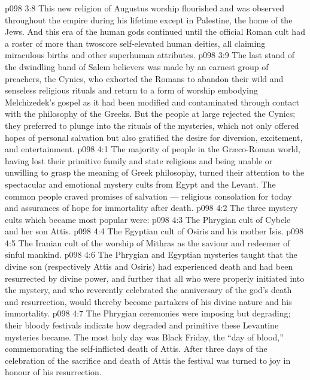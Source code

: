\vs p098 3:8 This new religion of Augustus worship flourished and was observed throughout the empire during his lifetime except in Palestine, the home of the Jews. And this era of the human gods continued until the official Roman cult had a roster of more than twoscore self\hyp{}elevated human deities, all claiming miraculous births and other superhuman attributes.
\vs p098 3:9 \pc The last stand of the dwindling band of Salem believers was made by an earnest group of preachers, the Cynics, who exhorted the Romans to abandon their wild and senseless religious rituals and return to a form of worship embodying Melchizedek’s gospel as it had been modified and contaminated through contact with the philosophy of the Greeks. But the people at large rejected the Cynics; they preferred to plunge into the rituals of the mysteries, which not only offered hopes of personal salvation but also gratified the desire for diversion, excitement, and entertainment.
\vs p098 4:1 The majority of people in the Gr\ae co\hyp{}Roman world, having lost their primitive family and state religions and being unable or unwilling to grasp the meaning of Greek philosophy, turned their attention to the spectacular and emotional mystery cults from Egypt and the Levant. The common people craved promises of salvation --- religious consolation for today and assurances of hope for immortality after death.
\vs p098 4:2 The three mystery cults which became most popular were:
\vs p098 4:3 \bibnobreakspace The Phrygian cult of Cybele and her son Attis.
\vs p098 4:4 \bibnobreakspace The Egyptian cult of Osiris and his mother Isis.
\vs p098 4:5 \bibnobreakspace The Iranian cult of the worship of Mithras as the saviour and redeemer of sinful mankind.
\vs p098 4:6 \pc The Phrygian and Egyptian mysteries taught that the divine son (respectively Attis and Osiris) had experienced death and had been resurrected by divine power, and further that all who were properly initiated into the mystery, and who reverently celebrated the anniversary of the god’s death and resurrection, would thereby become partakers of his divine nature and his immortality.
\vs p098 4:7 \pc The Phrygian ceremonies were imposing but degrading; their bloody festivals indicate how degraded and primitive these Levantine mysteries became. The most holy day was Black Friday, the “day of blood,” commemorating the self\hyp{}inflicted death of Attis. After three days of the celebration of the sacrifice and death of Attis the festival was turned to joy in honour of his resurrection.
